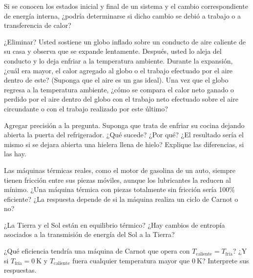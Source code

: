 %
\begin{Exercise}
  Si se conocen los estados inicial y final de un sistema y el cambio correspondiente de energía interna, ¿podría determinarse si dicho cambio se debió a trabajo o a transferencia de calor?
\end{Exercise}
%
\begin{Exercise}
  {\color{red} ¿Eliminar?} Usted sostiene un globo inflado sobre un conducto de aire caliente de su casa y observa que se expande lentamente. Después, usted lo aleja del conducto y lo deja enfriar a la temperatura ambiente. Durante la expansión, ¿cuál era mayor, el calor agregado al globo o el trabajo efectuado por el aire dentro de este? (Suponga que el aire es un gas ideal). Una vez que el globo  regresa a la temperatura ambiente, ¿cómo se compara el calor neto ganado o perdido por el aire dentro del globo con el trabajo neto efectuado sobre el aire circundante o con el trabajo realizado por este último?
\end{Exercise}
%
\begin{Exercise}
  {\color{red} Agregar precisión a la pregunta.} Suponga que trata de enfriar su cocina dejando abierta la puerta del refrigerador. ¿Qué sucede? ¿Por qué? ¿El resultado sería el mismo si se dejara abierta una hielera llena de hielo? Explique las diferencias, si las hay.
\end{Exercise}
%
\begin{Exercise}
  Las máquinas térmicas reales, como el motor de gasolina de un auto, siempre tienen fricción entre sus piezas móviles, aunque los lubricantes la reducen al mínimo. ¿Una máquina térmica con piezas totalmente sin fricción sería 100\% eficiente? ¿La respuesta depende de si la máquina realiza un ciclo de Carnot o no?
\end{Exercise}
%
\begin{Exercise}
  ¿La Tierra y el Sol están en equilibrio térmico? ¿Hay cambios de entropía asociados a la transmisión de energía del Sol a la Tierra?
\end{Exercise}
%
\begin{Exercise}
  ¿Qué eficiencia tendría una máquina de Carnot que opera con $T_\text{caliente} = T_\text{fría}$? ¿Y si  $T_\text{fría} = \SI{0}{\kelvin}$ y $T_\text{caliente}$ fuera cualquier temperatura mayor que $\SI{0}{\kelvin}$? Interprete sus respuestas.
\end{Exercise}
%